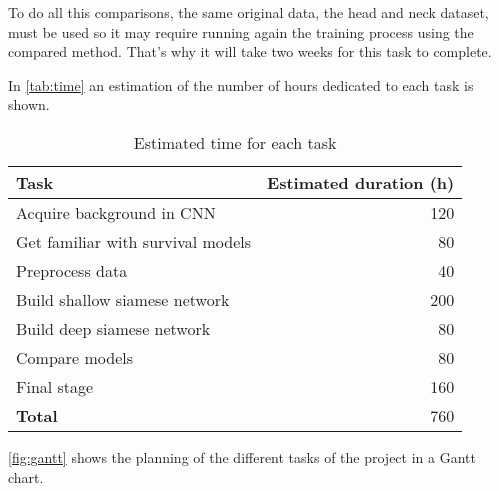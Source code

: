 To do all this comparisons, the same original data, the head and neck dataset, must be 
used so it may require running again the training process using the compared method. 
That's why it will take two weeks for this task to complete.


In \autoref{tab:time} an estimation of the number of hours dedicated to each task is shown.

\begin{table}[H]
  \centering{}
  \begin{tabular}{|l|r|}
    \hline
    Task & Estimated duration (h) \\ \hline \hline
    Acquire background in CNN & 120 \\ \hline
    Get familiar with survival models & 80 \\ \hline
    Preprocess data & 40 \\ \hline
    Build shallow siamese network & 200 \\ \hline
    Build deep siamese network & 80 \\ \hline
    Compare models & 80 \\ \hline
    Final stage & 160 \\ 

  
    \hline \hline
    \textbf{Total} & 760 \\
    \hline
  \end{tabular}
  \caption{Estimated time for each task \label{tab:time}}
\end{table}


\autoref{fig:gantt} shows the planning of the different tasks of the project in a Gantt chart.

